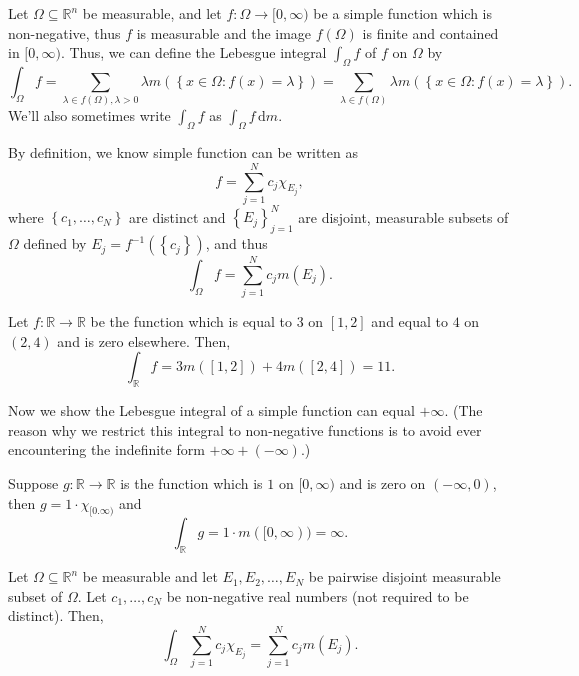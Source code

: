 \begin{definition}
    Let \(\Omega \subseteq \mathbb{R} ^n\) be measurable, and let \(f : \Omega \to [0, \infty) \) be a simple function which is non-negative, thus \(f\) is measurable and the image \(f(\Omega)\) is finite and contained in \([0, \infty)\). Thus, we can define the Lebesgue integral \(\int _{\Omega } f\) of \(f\) on \(\Omega \) by 
    \[
        \int _{\Omega} f = \sum_{\lambda \in f(\Omega), \lambda > 0} \lambda m\left( \left\{ x \in \Omega: f(x) = \lambda \right\}  \right) = \sum_{\lambda \in f(\Omega)} \lambda m\left( \left\{ x \in \Omega: f(x) = \lambda \right\}  \right).  
    \]    
    We'll also sometimes write \(\int _{\Omega} f\) as \(\int _\Omega f \, \mathrm{d} m \).
\end{definition}

\begin{remark}
    By definition, we know  simple function can be written as 
    \[
        f = \sum_{j=1}^N c_j \chi _{E_j}, 
    \]
    where \(\left\{ c_1, \dots , c_N \right\} \) are distinct and \(\left\{ E_j \right\}_{j=1}^N \) are disjoint, measurable subsets of \(\Omega\) defined by \(E_j = f^{-1} (\left\{ c_j \right\} )\), and thus 
    \[
        \int _{\Omega } f = \sum_{j=1}^N c_j m(E_j). 
    \]   
\end{remark}

\begin{eg}
    Let \(f: \mathbb{R} \to \mathbb{R}\) be the function which is equal to \(3\) on \([1, 2]\) and equal to \(4\) on \((2, 4)\) and is zero elsewhere. Then, 
    \[
        \int _\mathbb{R} f = 3 m([1, 2]) + 4 m([2, 4]) = 11.
    \]     
\end{eg}

Now we show the Lebesgue integral of a simple function can equal \(+\infty\). (The reason why we restrict this integral to non-negative functions is to avoid ever encountering the indefinite form \(+\infty + (-\infty)\).)

\begin{eg}
    Suppose \(g: \mathbb{R} \to \mathbb{R} \) is the function which is \(1\) on \([0, \infty)\) and is zero on \((-\infty , 0)\), then \(g = 1 \cdot \chi _{[0. \infty)}\) and 
    \[
        \int _{\mathbb{R}} g = 1 \cdot m([0, \infty)) = \infty.
    \]      
\end{eg}

\begin{lemma}
    Let \(\Omega \subseteq \mathbb{R} ^n\) be measurable and let \(E_1, E_2, \dots , E_N\) be pairwise disjoint measurable subset of \(\Omega\). Let \(c_1, \dots , c_N\) be non-negative real numbers (not required to be distinct). Then,
    \[
        \int _{\Omega} \sum_{j=1}^N c_j \chi _{E_j} = \sum_{j=1}^N c_j m(E_j).  
    \]    
\end{lemma}

